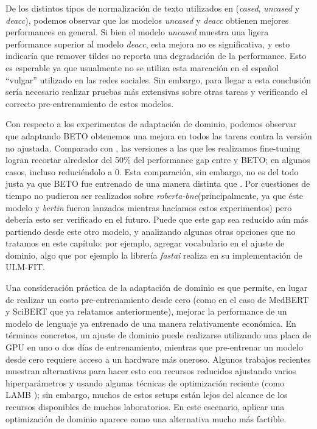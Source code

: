 De los distintos tipos de normalización de texto utilizados en \robertuito{} (\emph{cased}, \emph{uncased} y \emph{deacc}), podemos observar que los modelos \emph{uncased} y \emph{deacc} obtienen mejores performances en general. Si bien el modelo \emph{uncased} muestra una ligera performance superior al modelo \emph{deacc}, esta mejora no es significativa, y esto indicaría que remover tildes no reporta una degradación de la performance. Esto es esperable ya que usualmente no se utiliza esta marcación en el español ``vulgar'' utilizado en las redes sociales. Sin embargo, para llegar a esta conclusión sería necesario realizar pruebas más extensivas sobre otras tareas y verificando el correcto pre-entrenamiento de estos modelos.

Con respecto a los experimentos de adaptación de dominio, podemos observar que adaptando BETO obtenemos una mejora en todos las tareas contra la versión no ajustada. Comparado con \robertuito{}, las versiones a las que les realizamos fine-tuning logran recortar alrededor del 50\% del performance gap entre \robertuito{} y BETO; en algunos casos, incluso reduciéndolo a 0. Esta comparación, sin embargo, no es del todo justa ya que BETO fue entrenado de una manera distinta que \robertuito{}. Por cuestiones de tiempo no pudieron ser realizados sobre \emph{roberta-bne}(principalmente, ya que éste modelo y \emph{bertin} fueron lanzados mientras hacíamos estos experimentos) pero debería esto ser verificado en el futuro. Puede que este gap sea reducido aún más partiendo desde este otro modelo, y analizando algunas otras opciones que no tratamos en este capítulo: por ejemplo, agregar vocabulario en el ajuste de dominio, algo que por ejemplo la librería \emph{fastai} realiza en su implementación de ULM-FIT.

Una consideración práctica de la adaptación de dominio es que permite, en lugar de realizar un costo pre-entrenamiento desde cero (como en el caso de MedBERT y SciBERT que ya relatamos anteriormente), mejorar la performance de un modelo de lenguaje ya entrenado de una manera relativamente económica. En términos concretos, un ajuste de dominio puede realizarse utilizando una placa de GPU en uno o dos días de entrenamiento, mientras que pre-entrenar un modelo desde cero requiere acceso a un hardware más oneroso. Algunos trabajos recientes \cite{izsak2021train} muestran alternativas para hacer esto con recursos reducidos ajustando varios hiperparámetros y usando algunas técnicas de optimización reciente (como LAMB \cite{you2019large}); sin embargo, muchos de estos setups están lejos del alcance de los recursos disponibles de muchos laboratorios. En este escenario, aplicar una optimización de dominio aparece como una alternativa mucho más factible.

